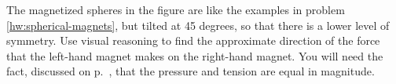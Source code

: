 The magnetized spheres in the figure are like the examples in
problem \ref{hw:spherical-magnets}, but tilted at
45 degrees, so that there is a lower level of symmetry.
Use visual reasoning to find the approximate direction
of the force that the left-hand magnet
makes on the right-hand magnet. You will need the fact,
discussed on p.~\pageref{p-t-equal}, that the pressure
and tension are equal in magnitude.
